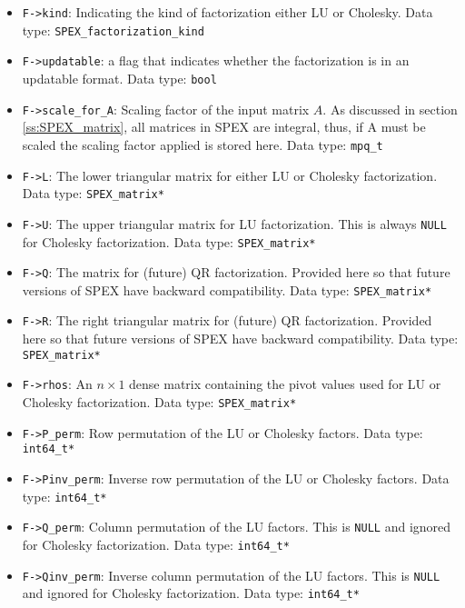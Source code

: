 \documentclass[12pt]{report}
\theoremstyle{definition}
\begin{document}
\begin{itemize}
\item \verb|F->kind|: Indicating the kind of factorization either LU or Cholesky. Data type: \verb|SPEX_factorization_kind|

\item \verb|F->updatable|: a flag that indicates whether the factorization is in an updatable format. Data type: \verb|bool|

\item \verb|F->scale_for_A|: Scaling factor of the input matrix $A$. As discussed in section \ref{ss:SPEX_matrix}, all matrices in SPEX are integral, thus, if A must be scaled the scaling factor applied is stored here. Data type: \verb|mpq_t|

\item \verb|F->L|: The lower triangular matrix for either LU or Cholesky factorization. Data type: \verb|SPEX_matrix*|

\item \verb|F->U|: The upper triangular matrix for LU factorization. This is always \verb|NULL| for Cholesky factorization. Data type: \verb|SPEX_matrix*|

\item \verb|F->Q|: The matrix for (future) QR factorization. Provided here so that future versions of SPEX have backward compatibility. Data type: \verb|SPEX_matrix*|

\item \verb|F->R|: The right triangular matrix for (future) QR factorization. Provided here so that future versions of SPEX have backward compatibility. Data type: \verb|SPEX_matrix*|

\item \verb|F->rhos|: An $n \times 1$ dense matrix containing the pivot values used for LU or Cholesky factorization. Data type: \verb|SPEX_matrix*|

\item \verb|F->P_perm|: Row permutation of the LU or Cholesky factors. Data type: \verb|int64_t*|

\item \verb|F->Pinv_perm|: Inverse row permutation of the LU or Cholesky factors. Data type: \verb|int64_t*|

\item \verb|F->Q_perm|: Column permutation of the LU factors. This is \verb|NULL| and ignored for Cholesky factorization. Data type: \verb|int64_t*|

\item \verb|F->Qinv_perm|: Inverse column permutation of the LU factors. This is \verb|NULL| and ignored for Cholesky factorization. Data type: \verb|int64_t*|
\end{itemize}
\end{document}

